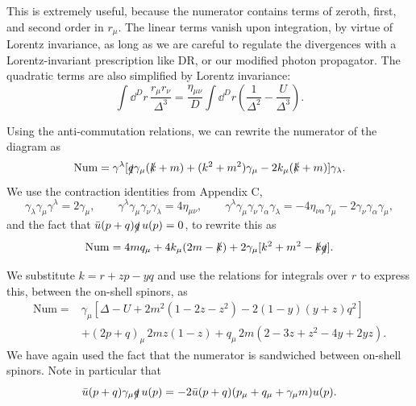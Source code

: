 This is extremely useful, because the numerator contains terms of zeroth, first, and
second order in $r_\mu$. The linear terms vanish upon integration, by virtue of Lorentz
invariance, as long as we are careful to regulate the divergences with a Lorentz-invariant
prescription like DR, or our modified photon propagator. The quadratic terms are also
simplified by Lorentz invariance:
\begin{equation*}
  \int \dd^D r\,\frac{r_\mu r_\nu}{\Delta^3}
  =\frac{\eta_{\mu\nu}}{D}\int \dd^D r
    \left(\frac1{\Delta^2}-\frac{U}{\Delta^3}\right).
\end{equation*}

Using the anti-commutation relations, we can rewrite the numerator of the diagram
as
\begin{equation*}
  \mathrm{Num}=\gamma^\lambda[\slashed q\gamma_\mu(\slashed k+m)+(k^2+m^2)\gamma_\mu
  -2k_\mu(\slashed k+m)]\gamma_\lambda.
\end{equation*}
We use the contraction identities from Appendix C,
\begin{equation*}
  \gamma_\lambda\gamma_\mu\gamma^\lambda=2\gamma_\mu,
  \qquad
  \gamma^\lambda\gamma_\mu\gamma_\nu\gamma_\lambda=4\eta_{\mu\nu},
  \qquad
  \gamma^\lambda\gamma_\mu\gamma_\nu\gamma_\alpha\gamma_\lambda
  =-4\eta_{\nu\alpha}\gamma_\mu-2\gamma_\nu\gamma_\alpha\gamma_\mu,
\end{equation*}
and the fact that $\bar u(p+q)\slashed q\,u(p)=0$, to rewrite this as
\begin{equation*}
  \mathrm{Num}=4mq_\mu+4k_\mu(2m-\slashed k)
  +2\gamma_\mu[k^2+m^2-\slashed k\slashed q].
\end{equation*}

We substitute $k=r+zp-yq$ and use the relations for integrals over $r$ to express
this, between the on-shell spinors, as
\begin{equation*}
  \begin{aligned}
  \mathrm{Num}={}&\gamma_\mu\left[\Delta-U+2m^2(1-2z-z^2)
       -2(1-y)(y+z)q^2\right]\\
  &+(2p+q)_\mu\,2mz(1-z)
    +q_\mu\,2m(2-3z+z^2-4y+2yz).
  \end{aligned}
\end{equation*}
We have again used the fact that the numerator is sandwiched between on-shell spinors.
Note in particular that
\begin{equation*}
\bar u(p+q)\gamma_\mu\slashed q\,u(p)
  =-2\bar u(p+q)(p_\mu+q_\mu+\gamma_\mu m)u(p).
\end{equation*}

